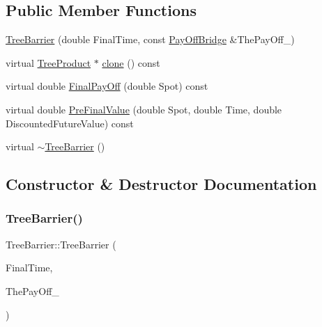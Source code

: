 \subsection*{Public Member Functions}
\begin{DoxyCompactItemize}
\item 
\hyperlink{classTreeBarrier_ac40377a58cf46318c0d651efb721c404}{Tree\+Barrier} (double Final\+Time, const \hyperlink{classPayOffBridge}{Pay\+Off\+Bridge} \&The\+Pay\+Off\+\_\+)
\item 
virtual \hyperlink{classTreeProduct}{Tree\+Product} $\ast$ \hyperlink{classTreeBarrier_a549dec4cf147800496f9efca623201f9}{clone} () const
\item 
virtual double \hyperlink{classTreeBarrier_a920dcdcf9a3b00f6a83c13fbe51b5b8a}{Final\+Pay\+Off} (double Spot) const
\item 
virtual double \hyperlink{classTreeBarrier_a507840c03551ece81bae4a97d342a368}{Pre\+Final\+Value} (double Spot, double Time, double Discounted\+Future\+Value) const
\item 
virtual \hyperlink{classTreeBarrier_a6d52330a6a75ef18befe5aef59475809}{$\sim$\+Tree\+Barrier} ()
\end{DoxyCompactItemize}


\subsection{Constructor \& Destructor Documentation}
\hypertarget{classTreeBarrier_ac40377a58cf46318c0d651efb721c404}{}\label{classTreeBarrier_ac40377a58cf46318c0d651efb721c404} 
\subsubsection{\texorpdfstring{Tree\+Barrier()}{TreeBarrier()}}
{\footnotesize\ttfamily Tree\+Barrier\+::\+Tree\+Barrier (\begin{DoxyParamCaption}\item[{double}]{Final\+Time,  }\item[{const \hyperlink{classPayOffBridge}{Pay\+Off\+Bridge} \&}]{The\+Pay\+Off\+\_\+ }\end{DoxyParamCaption})}

\hypertarget{classTreeBarrier_a6d52330a6a75ef18befe5aef59475809}{}\label{classTreeBarrier_a6d52330a6a75ef18befe5aef59475809} 
